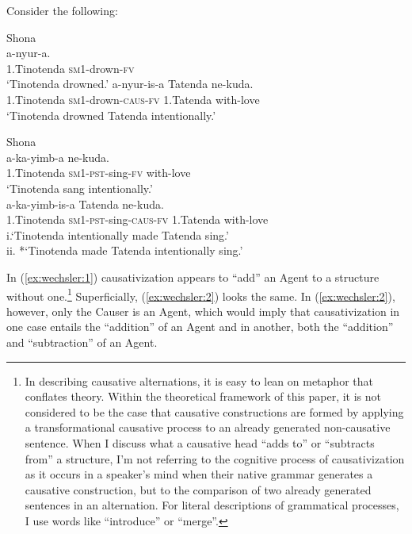 \documentclass[output=paper,modfonts,nonflat,colorlinks,citecolor=brown]{langsci/langscibook}
\begin{document}
Consider the following:

\ea\label{ex:wechsler:1}
Shona\\
\ea\label{ex:wechsler:1a}  {a-nyur-a}.\\
1.Tinotenda \textsc{sm1-}drown\textsc{-fv}\\
\glt ‘Tinotenda drowned.’
\ex\label{ex:wechsler:1c}  {a-nyur-is-a} {Tatenda} {ne-kuda}.\\
1.Tinotenda \textsc{sm1-}drown\textsc{-caus-fv} {1.Tatenda} {with-love}\\
\glt ‘Tinotenda drowned Tatenda intentionally.’\\
\z
\z

\ea\label{ex:wechsler:2}
Shona\\
\ea\label{ex:wechsler:2a}  {a-ka-yimb-a} {ne-kuda}.\\
1.Tinotenda \textsc{sm1-pst-}sing\textsc{-fv} with-love\\
\glt ‘Tinotenda sang intentionally.’\\
\ex\label{ex:wechsler:2b}  {a-ka-yimb-is-a} {Tatenda} {ne-kuda}.\\
1.Tinotenda \textsc{sm1-pst-}sing\textsc{-caus-fv} 1.Tatenda with-love\\
\glt\label{ex:wechsler:2c} i.‘Tinotenda intentionally made Tatenda sing.’\\
ii. *‘Tinotenda made Tatenda intentionally sing.’
\z
\z

In (\ref{ex:wechsler:1}) causativization appears to “add” an Agent to a structure without one.\footnote{In describing causative alternations, it is easy to lean on metaphor that conflates theory. Within the theoretical framework of this paper, it is not considered to be the case that causative constructions are formed by applying a transformational causative process to an already generated non-causative sentence. When I discuss what a causative head “adds to” or “subtracts from” a structure, I’m not referring to the cognitive process of causativization as it occurs in a speaker’s mind when their native grammar generates a causative construction, but to the comparison of two already generated sentences in an alternation. For literal descriptions of grammatical processes, I use words like “introduce” or “merge”.} Superficially, (\ref{ex:wechsler:2}) looks the same. In (\ref{ex:wechsler:2}), however, only the Causer is an Agent, which would imply that causativization in one case entails the “addition” of an Agent and in another, both the “addition” and “subtraction” of an Agent.
\end{document}
